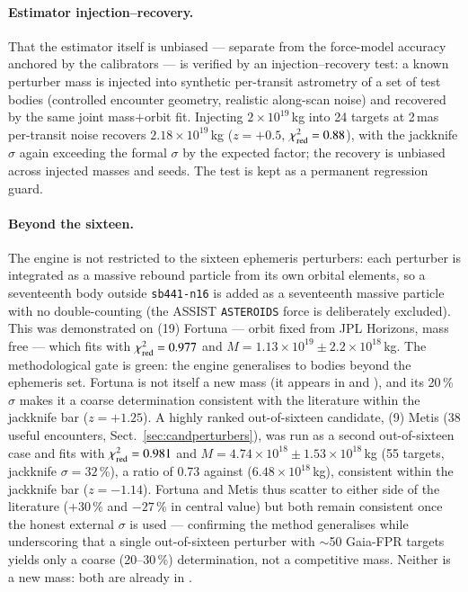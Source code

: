 \documentclass{aa}
\begin{document}
\paragraph{Estimator injection--recovery.} That the estimator itself is unbiased
--- separate from the force-model accuracy anchored by the calibrators --- is
verified by an injection--recovery test: a known perturber mass is injected into
synthetic per-transit astrometry of a set of test bodies (controlled encounter
geometry, realistic along-scan noise) and recovered by the same joint mass$+$orbit
fit. Injecting $2\times10^{19}$\,kg into 24 targets at 2\,mas per-transit noise
recovers $2.18\times10^{19}$\,kg ($z=+0.5$, $\chi^2_{\rm red}=0.88$), with the
jackknife $\sigma$ again exceeding the formal $\sigma$ by the expected factor; the
recovery is unbiased across injected masses and seeds. The test is kept as a
permanent regression guard.

\paragraph{Beyond the sixteen.} The engine is not restricted to the sixteen
ephemeris perturbers: each perturber is integrated as a massive rebound particle
from its own orbital elements, so a seventeenth body outside \texttt{sb441-n16}
is added as a seventeenth massive particle with no double-counting (the ASSIST
\texttt{ASTEROIDS} force is deliberately excluded). This was demonstrated on
(19) Fortuna --- orbit fixed from JPL Horizons, mass free --- which fits with
$\chi^2_{\rm red} = 0.977$ and $M = 1.13\times10^{19}\pm2.2\times10^{18}$\,kg.
The methodological gate is green: the engine generalises to bodies beyond the
ephemeris set. Fortuna is not itself a new mass (it appears in
\citealt{goffin2014} and \citealt{fuentesmunoz2025}), and its 20\,\% $\sigma$
makes it a coarse determination consistent with the literature within the
jackknife bar ($z=+1.25$). A highly ranked out-of-sixteen candidate,
(9) Metis (38 useful encounters, Sect.~\ref{sec:candperturbers}), was run as a
second out-of-sixteen case and fits with $\chi^2_{\rm red} = 0.981$ and
$M = 4.74\times10^{18}\pm1.53\times10^{18}$\,kg (55 targets, jackknife
$\sigma = 32$\,\%), a ratio of 0.73 against \citet{fuentesmunoz2025}
($6.48\times10^{18}$\,kg), consistent within the jackknife bar ($z=-1.14$).
Fortuna and Metis thus scatter to either side of the literature ($+30$\,\% and
$-27$\,\% in central value) but both remain consistent once the honest external
$\sigma$ is used --- confirming the method generalises while underscoring that a
single out-of-sixteen perturber with $\sim$50 Gaia-FPR targets yields only a
coarse (20--30\,\%) determination, not a competitive mass. Neither is a new
mass: both are already in \citet{fuentesmunoz2025}.
\end{document}
